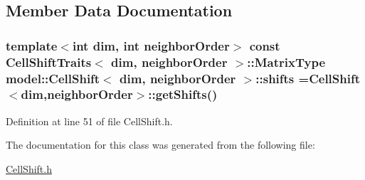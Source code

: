 \subsection{Member Data Documentation}
\hypertarget{classmodel_1_1_cell_shift_a433e1eeaa68989c6c916af2623c3f2ab}{}
\subsubsection[{shifts}]{\setlength{\rightskip}{0pt plus 5cm}template$<$int dim, int neighbor\+Order$>$ const {\bf Cell\+Shift\+Traits}$<$ {\bf dim}, neighbor\+Order $>$\+::Matrix\+Type {\bf model\+::\+Cell\+Shift}$<$ {\bf dim}, neighbor\+Order $>$\+::shifts ={\bf Cell\+Shift}$<${\bf dim},neighbor\+Order$>$\+::get\+Shifts()\hspace{0.3cm}{\ttfamily [static]}}\label{classmodel_1_1_cell_shift_a433e1eeaa68989c6c916af2623c3f2ab}


Definition at line 51 of file Cell\+Shift.\+h.



The documentation for this class was generated from the following file\+:\begin{DoxyCompactItemize}
\item 
\hyperlink{_cell_shift_8h}{Cell\+Shift.\+h}\end{DoxyCompactItemize}
